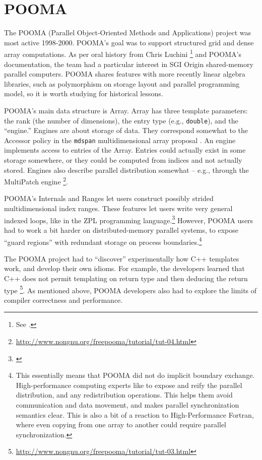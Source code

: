 \section{POOMA}

The POOMA (Parallel Object-Oriented Methods and Applications) project was most
active 1998-2000. POOMA's goal was to support structured grid and dense array
computations. As per oral history from Chris Luchini \footnote{See \cite{hoemmen2018history}.} and POOMA's documentation, the team had a
particular interest in SGI Origin shared-memory parallel computers. POOMA shares
features with more recently linear algebra libraries, such as polymorphism on
storage layout and parallel programming model, so it is worth studying for
historical lessons.

POOMA's main data structure is Array. Array has three template parameters:
the rank (the number of dimensions),
the entry type (e.g., \texttt{double}),
and the ``engine.''
Engines are about storage of data.
They correspond somewhat to the Accessor policy
in the \texttt{mdspan} multidimensional array proposal \cite{Edwards}.
An engine implements access to entries of the Array.
Entries could actually exist in some storage somewhere,
or they could be computed from indices and not actually stored. Engines also
describe parallel distribution somewhat -- e.g., through the MultiPatch engine
\footnote{\url{http://www.nongnu.org/freepooma/tutorial/tut-04.html}}.

POOMA's Internals and Ranges let users construct possibly strided
multidimensional index ranges. These features let users write very general
indexed loops, like in the ZPL programming language.\footnote{\cite{Chamberlain1998}}
However, POOMA users had to work a bit harder on distributed-memory parallel
systems, to expose ``guard regions'' with redundant storage on process boundaries.\footnote{ This essentially means that POOMA did not do implicit boundary
  exchange.  High-performance computing experts like to expose and reify the
  parallel distribution, and any redistribution operations. This helps them
  avoid communication and data movement, and makes parallel synchronization
  semantics clear.  This is also a bit of a reaction to High-Performance
  Fortran, where even copying from one array to another could require parallel
  synchronization.
}

The POOMA project had to ``discover'' experimentally how C++ templates work, and
develop their own idioms. For example, the developers learned that C++
does not permit templating on return type and then deducing the return type
\footnote{\url{http://www.nongnu.org/freepooma/tutorial/tut-03.html}}.
As mentioned above, POOMA developers also had to explore the limits of compiler
correctness and performance.

